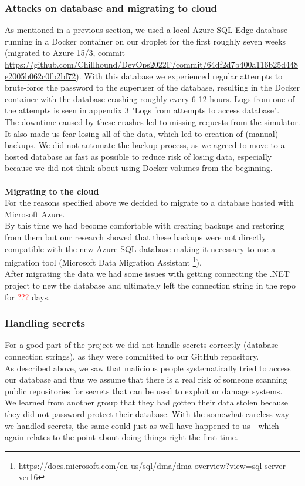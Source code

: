 \subsubsection{Attacks on database and migrating to cloud}
As mentioned in a previous section, we used a local Azure SQL Edge database running in a Docker container on our droplet for the first roughly seven weeks (migrated to Azure 15/3, commit \url{https://github.com/Chillhound/DevOps2022F/commit/64df2d7b400a116b25d448e2005b062c0fb2bf72}). With this database we experienced regular attempts to brute-force the password to the superuser of the database, resulting in the Docker container with the database crashing roughly every 6-12 hours. Logs from one of the attempts is seen in appendix 3 "Logs from attempts to access database". \\
The downtime caused by these crashes led to missing requests from the simulator. It also made us fear losing all of the data, which led to creation of (manual) backups. We did not automate the backup process, as we agreed to move to a hosted database as fast as possible to reduce risk of losing data, especially because we did not think about using Docker volumes from the beginning. 
\\ \\
\textbf{Migrating to the cloud} \\
For the reasons specified above we decided to migrate to a database hosted with Microsoft Azure. \\
By this time we had become comfortable with creating backups and restoring from them but our research showed that 
these backups were not directly compatible with the new Azure SQL database making it necessary to use a migration tool (Microsoft Data Migration Assistant \footnote{https://docs.microsoft.com/en-us/sql/dma/dma-overview?view=sql-server-ver16}). \\
After migrating the data we had some issues with getting connecting the .NET project to new the database and ultimately 
left the connection string in the repo for \textcolor{red}{???} days. 


\subsubsection{Handling secrets}
For a good part of the project we did not handle secrets correctly (database connection strings), as they were committed to our GitHub repository. \\
As described above, we saw that malicious people systematically tried to access our database and thus we assume that there is a real risk of someone scanning public repositories for secrets that can be used to exploit or damage systems. \\
We learned from another group that they had gotten their data stolen because they did not password protect their database.
With the somewhat careless way we handled secrets, the same could just as well have happened to us - which again relates to the point about doing things right the first time. \\


